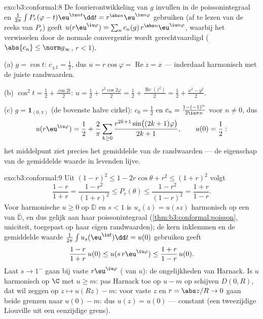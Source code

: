 \begin{solution}{exo:b3:conformal:8}
De fourierontwikkeling van $g$ invullen in de poissonintegraal
en $\frac1{2\pi}\int P_r(\varphi - t)\eu^{\iu nt}\dd t = r^{\abs
n}\eu^{\iu n\varphi}$ gebruiken (af te lezen van de reeks van
$P_r$) geeft $u(r\eu^{\iu\varphi}) = \sum_nc_n(g)\,r^{\abs
n}\eu^{\iu n\varphi}$, waarbij het verwisselen door de normale
convergentie wordt gerechtvaardigd ($\abs{c_n} \leq \norm
g_\infty$, $r < 1$).

(a) $g = \cos t$: $c_{\pm1} = \frac12$, dus $u = r\cos\varphi =
\operatorname{Re}z = x$ --- inderdaad harmonisch met de juiste
randwaarden.

(b) $\cos^2t = \frac12 + \frac{\cos 2t}2$: $u = \frac12 +
\frac{r^2\cos2\varphi}2 = \frac12 + \frac{\operatorname{Re}(z^2)}2
= \frac12 + \frac{x^2 - y^2}{2}$.

(c) $g = \mathbf 1_{(0,\pi)}$ (de bovenste halve cirkel): $c_0 =
\frac12$ en $c_n = \frac{1 - (-1)^n}{2\iu\pi n}$ voor $n \neq 0$,
dus
\[
u(r\eu^{\iu\varphi}) = \frac12 + \frac2\pi\sum_{k\geq0}
\frac{r^{2k+1}\sin\bigl((2k+1)\varphi\bigr)}{2k + 1},
\qquad u(0) = \frac12 :
\]
het middelpunt ziet precies het gemiddelde van de randwaarden ---
de eigenschap van de gemiddelde waarde in levenden lijve.
\end{solution}

\begin{solution}{exo:b3:conformal:9}
Uit $(1-r)^2 \leq 1 - 2r\cos\theta + r^2 \leq (1+r)^2$ volgt
\[
\frac{1-r}{1+r} = \frac{1 - r^2}{(1+r)^2} \leq P_r(\theta)
\leq \frac{1 - r^2}{(1 - r)^2} = \frac{1+r}{1-r} .
\]
Voor harmonische $u \geq 0$ op $\mathbb D$ en $s < 1$ is $u_s(z)
= u(sz)$ harmonisch op een  van $\bar{\mathbb D}$, en dus
gelijk aan haar poissonintegraal
(\cref{thm:b3:conformal:poisson}, uniciteit, toegepast op haar
eigen randwaarden); de kern inklemmen en de gemiddelde waarde
$\frac1{2\pi}\int u_s(\eu^{\iu t})\dd t = u(0)$ gebruiken geeft
\[
\frac{1-r}{1+r}\,u(0) \leq u(s\,r\eu^{\iu\varphi}) \leq
\frac{1+r}{1-r}\,u(0).
\]
Laat $s \to 1^-$ gaan bij vaste $r\eu^{\iu\varphi}$ (
van $u$): de ongelijkheden van Harnack. Is $u$ harmonisch op $\C$
met $u \geq m$: pas Harnack toe op $u - m$ op schijven $D(0, R)$,
dat wil zeggen op $z \mapsto u(Rz) - m$: voor vaste $z$ en $r =
\abs z/R \to 0$ gaan beide grenzen naar $u(0) - m$: dus $u(z) =
u(0)$ --- constant (een tweezijdige Liouville uit een eenzijdige
grens).
\end{solution}

